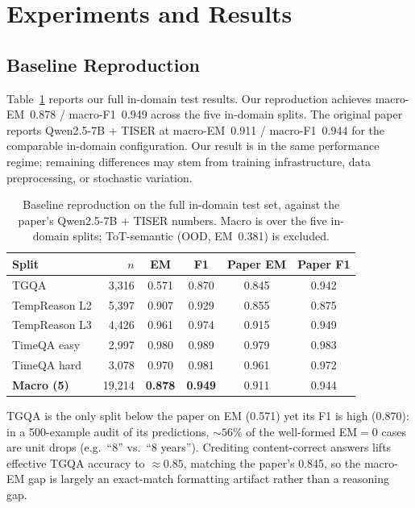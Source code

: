 \documentclass[conference]{IEEEtran}
\begin{document}
\section{Experiments and Results}

\subsection{Baseline Reproduction}

Table~\ref{tab:baseline} reports our full in-domain test results. Our reproduction achieves macro-EM~0.878 / macro-F1~0.949 across the five in-domain splits. The original paper reports Qwen2.5-7B + TISER at macro-EM~0.911 / macro-F1~0.944 for the comparable in-domain configuration. Our result is in the same performance regime; remaining differences may stem from training infrastructure, data preprocessing, or stochastic variation.

\begin{table}[t]
\centering
\caption{Baseline reproduction on the full in-domain test set, against the paper's Qwen2.5-7B + TISER numbers. Macro is over the five in-domain splits; ToT-semantic (OOD, EM~0.381) is excluded.}
\label{tab:baseline}
\setlength{\tabcolsep}{4pt}
{\footnotesize
\begin{tabular}{lrcccc}
\toprule
\textbf{Split} & \textbf{$n$} & \textbf{EM} & \textbf{F1} & \textbf{Paper EM} & \textbf{Paper F1} \\
\midrule
TGQA            & 3{,}316 & 0.571 & 0.870 & 0.845 & 0.942 \\
TempReason L2   & 5{,}397 & 0.907 & 0.929 & 0.855 & 0.875 \\
TempReason L3   & 4{,}426 & 0.961 & 0.974 & 0.915 & 0.949 \\
TimeQA easy     & 2{,}997 & 0.980 & 0.989 & 0.979 & 0.983 \\
TimeQA hard     & 3{,}078 & 0.970 & 0.981 & 0.961 & 0.972 \\
\midrule
\textbf{Macro (5)} & 19{,}214 & \textbf{0.878} & \textbf{0.949} & 0.911 & 0.944 \\
\bottomrule
\end{tabular}
}
\end{table}

TGQA is the only split below the paper on EM (0.571) yet its F1 is high (0.870): in a 500-example audit of its predictions, ${\sim}56\%$ of the well-formed EM$=$0 cases are unit drops (e.g.\ ``8'' vs.\ ``8 years''). Crediting content-correct answers lifts effective TGQA accuracy to ${\approx}0.85$, matching the paper's 0.845, so the macro-EM gap is largely an exact-match formatting artifact rather than a reasoning gap.
\end{document}
